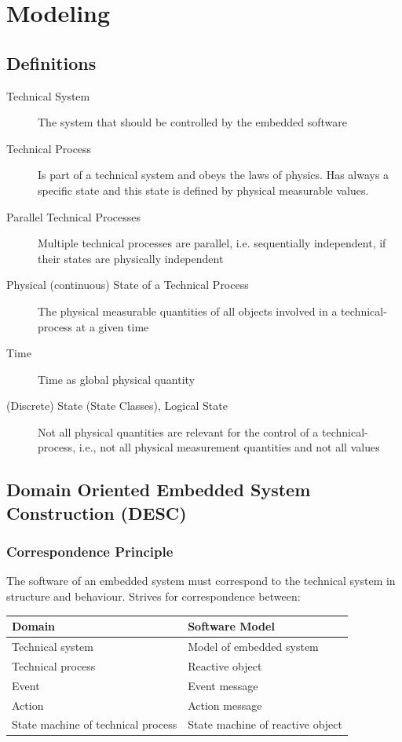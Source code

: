\section{Modeling}
\subsection{Definitions}
\begin{description}
    \item[Technical System] The system that should be controlled by the embedded software
    \item[Technical Process] Is part of a technical system and obeys the laws of physics.
          Has always a specific state and this state is defined by physical measurable values.
    \item[Parallel Technical Processes] Multiple technical processes are parallel, i.e. sequentially independent, if their states are physically independent
    \item[Physical (continuous) State of a Technical Process] The physical measurable quantities of all objects involved in a technical-process at a given time
    \item[Time] Time as global physical quantity
    \item[(Discrete) State (State Classes), Logical State] Not all physical quantities are relevant for the control of a technical-process, i.e., not all physical measurement quantities and not all values
\end{description}

\subsection{Domain Oriented Embedded System Construction (DESC)}
\subsubsection{Correspondence Principle}
The software of an embedded system must correspond to the technical system in structure and behaviour.
Strives for correspondence between:
\begin{table}[h]
    \begin{tabular}{ll}\hline
        Domain                             & Software Model                   \\\hline
        Technical system                   & Model of embedded system         \\
        Technical process                  & Reactive object                  \\
        Event                              & Event message                    \\
        Action                             & Action message                   \\
        State machine of technical process & State machine of reactive object \\\hline
    \end{tabular}
\end{table}

